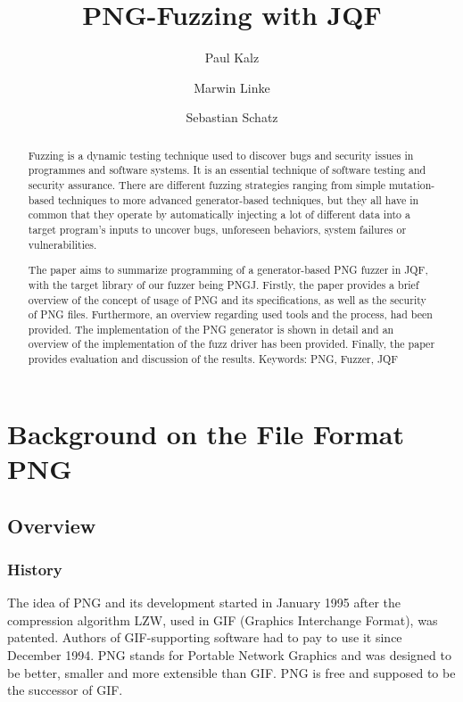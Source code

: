 \documentclass[runningheads]{llncs}
\begin{document}
%
\title{PNG-Fuzzing with JQF}
%
%
\author{Paul Kalz \and Marwin Linke \and Sebastian Schatz}
%
\maketitle              %
%
\begin{abstract}
Fuzzing is a dynamic testing technique used to discover bugs and
security issues in programmes and software systems. It is an essential
technique of software testing and security assurance. There are different
fuzzing strategies ranging from simple mutation-based techniques to more
advanced generator-based techniques, but they all have in common that
they operate by automatically injecting a lot of different data into a target
program's inputs to uncover bugs, unforeseen behaviors, system failures or
vulnerabilities.

The paper aims to summarize programming of a generator-based PNG fuzzer
in JQF, with the target library of our fuzzer being PNGJ. Firstly, the paper
provides a brief overview of the concept of usage of PNG and its
specifications, as well as the security of PNG files. Furthermore, an overview
regarding used tools and the process, had been provided. The
implementation of the PNG generator is shown in detail and an overview of
the implementation of the fuzz driver has been provided. Finally, the paper
provides evaluation and discussion of the results.
Keywords: PNG, Fuzzer, JQF

\end{abstract}
%
%
%
\section{Background on the File Format PNG}
\subsection{Overview}

\subsubsection{History}
The idea of PNG and its development started in January 1995 after the
compression algorithm LZW, used in GIF (Graphics Interchange Format), was
patented. Authors of GIF-supporting software had to pay to use it since
December 1994. PNG stands for Portable Network Graphics and was designed to be better, smaller
and more extensible than GIF. PNG is free and supposed to be the successor of
GIF.
\end{document}
